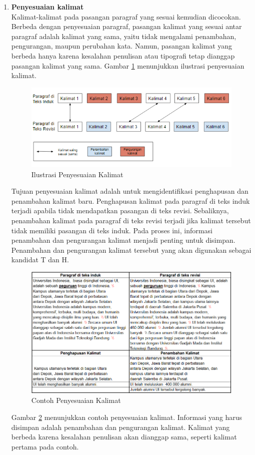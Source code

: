 \begin{enumerate}
	\item \textbf{Penyesuaian kalimat} \label{item:penyesuaian-kalimat} \\
	Kalimat-kalimat pada pasangan paragraf yang sesuai kemudian dicocokan. Berbeda dengan penyesuaian paragraf, pasangan kalimat yang sesuai antar paragraf adalah kalimat yang sama, yaitu tidak mengalami penambahan, pengurangan, maupun perubahan kata. Namun, pasangan kalimat yang berbeda hanya karena kesalahan penulisan atau tipografi tetap dianggap pasangan kalimat yang sama. Gambar \ref{fig:sen_align} menunjukkan ilustrasi penyesuaian kalimat.
	\begin{figure}
		\centering
		\includegraphics[width=0.85\linewidth]{pics/sen_align}
		\caption{Ilustrasi Penyesuaian Kalimat}
		\label{fig:sen_align}
	\end{figure}
	Tujuan penyesuaian kalimat adalah untuk mengidentifikasi penghapusan dan penambahan kalimat baru. Penghapusan kalimat pada paragraf di teks induk terjadi apabila tidak mendapatkan pasangan di teks revisi. Sebaliknya, penambahan kalimat pada paragraf di teks revisi terjadi jika kalimat tersebut tidak memiliki pasangan di teks induk. Pada proses ini, informasi penambahan dan pengurangan kalimat menjadi penting untuk disimpan. Penambahan dan pengurangan kalimat tersebut yang akan digunakan sebagai kandidat T dan H.\\
	\begin{figure}
		\centering
		\includegraphics[width=0.85\linewidth]{pics/contoh-penyesuaian-kal}
		\caption{Contoh Penyesuaian Kalimat}
		\label{fig:contoh-penyesuaian-kal}
	\end{figure}
	Gambar \ref{fig:contoh-penyesuaian-kal} menunjukkan contoh penyesuaian kalimat. Informasi yang harus disimpan adalah penambahan dan pengurangan kalimat. Kalimat yang berbeda karena kesalahan penulisan akan dianggap sama, seperti kalimat pertama pada contoh.
	

\end{enumerate}
